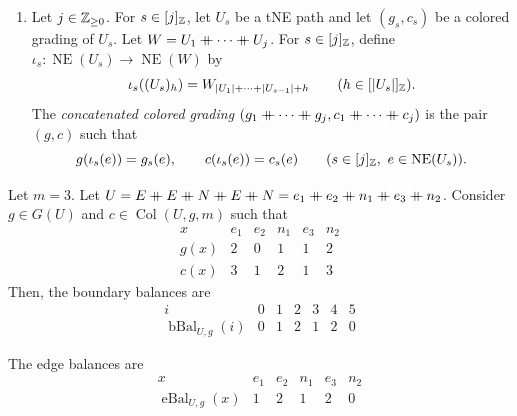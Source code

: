 \begin{definition}
\begin{enumerate}[font=\itshape]
The \textit{restricted colored grading} on $A$ is
\[
 (g|_A,c|_A)=\bigl(g|_{\operatorname{NE}(A)},c|_{\operatorname{NE}(A)}\bigr).
\]
Let $g$ and $c$ also denote these restrictions when the ambient path is specified.
\item Let $j\in\mathbb Z_{\ge0}$. For $s\in[j]_{\mathbb Z}$, let $U_s$ be a tNE path and let $(g_s,c_s)$ be a colored grading of $U_s$.
Let $W=U_1\mathbin{+\mkern-10mu+}\cdots\mathbin{+\mkern-10mu+} U_j$.
For $s\in[j]_{\mathbb Z}$, define $\iota_s:\operatorname{NE}(U_s)\to\operatorname{NE}(W)$ by
\[
 \iota_s((U_s)_h)=W_{|U_1|+\cdots+|U_{s-1}|+h}
 \qquad(h\in[|U_s|]_{\mathbb Z}).
\]
The \textit{concatenated colored grading} $(g_1\ccn\cdots\ccn g_j,c_1\ccn\cdots\ccn c_j)$ is the pair $(g,c)$ such that
\[
 g(\iota_s(e))=g_s(e),\qquad c(\iota_s(e))=c_s(e)
 \qquad(s\in[j]_{\mathbb Z},\ e\in\operatorname{NE}(U_s)).
\]
\end{enumerate}
\end{definition}

\begin{example}\label{ex:colored-balance}
Let $m=3$. Let $U=E\ccn E\ccn N\ccn E\ccn N=e_1\ccn e_2\ccn n_1\ccn e_3\ccn n_2$.
Consider $g\in G(U)$ and $c\in\operatorname{Col}(U,g,m)$ such that
\[
\begin{array}{c|ccccc}
 x&e_1&e_2&n_1&e_3&n_2\\\hline
 g(x)&2&0&1&1&2\\
 c(x)&3&1&2&1&3
\end{array}
\]
Then, the boundary balances are
\[
\begin{array}{c|rrrrrr}
 i&0&1&2&3&4&5\\\hline
 \operatorname{bBal}_{U,g}(i)&0&1&2&1&2&0
\end{array}
\]

The edge balances are
\[
\begin{array}{c|rrrrr}
 x&e_1&e_2&n_1&e_3&n_2\\\hline
 \operatorname{eBal}_{U,g}(x)&1&2&1&2&0
\end{array}
\]
\end{example}

